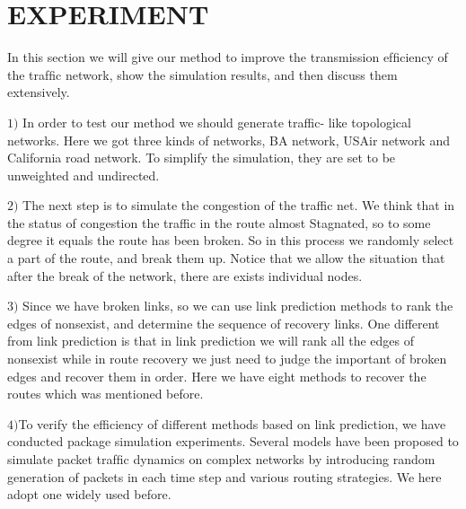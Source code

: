 \documentclass[onecolumn,preprintnumbers,amsmath,amssymb]{revtex4}
\begin{document}
\section*{EXPERIMENT\protect}

In this section we will give our method to improve the transmission efﬁciency of the  trafﬁc network, show the simulation results, and then discuss them extensively.


$1)$ In order to test our method we should generate traffic- like topological networks. Here we got three kinds of networks, BA network, USAir network and California road network. To simplify the simulation, they are set to be unweighted and undirected.

$2)$ The next step is to simulate the congestion of the traffic net. We think that in the status of congestion the traffic in the route almost Stagnated, so to some degree it equals the route has been broken. So in this process we randomly select a part of the route, and break them up. Notice that we allow the situation that after the break of the network, there are exists individual nodes.

$3)$ Since we have broken links, so we can use link prediction methods to rank the edges of nonsexist, and determine the sequence of recovery links. One different from link prediction is that in link prediction we will rank all the edges of nonsexist while in route recovery we just need to judge the important of broken edges and recover them in order. Here we have eight methods to recover the routes which was mentioned before. 

$4)$To verify the efficiency of different methods based on link prediction, we have conducted package simulation experiments. Several models have been proposed to simulate packet trafﬁc dynamics on complex networks by introducing random generation of packets in each time step and various routing strategies. We here adopt one widely used before.
\end{document}
